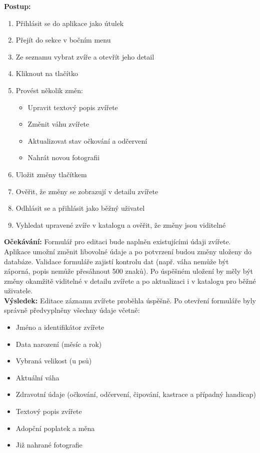 \documentclass[czech, bp, kiv, he, iso690numb, pdf]{fasthesis}
\begin{document}
    \noindent \textbf{Postup:}
    \begin{enumerate}
        \item Přihlásit se do aplikace jako útulek
        \item Přejít do sekce  v bočním menu
        \item Ze seznamu vybrat zvíře a otevřít jeho detail
        \item Kliknout na tlačítko 
        \item Provést několik změn:
        \begin{itemize}
            \item Upravit textový popis zvířete
            \item Změnit váhu zvířete
            \item Aktualizovat stav očkování a odčervení
            \item Nahrát novou fotografii
        \end{itemize}
        \item Uložit změny tlačítkem 
        \item Ověřit, že změny se zobrazují v detailu zvířete
        \item Odhlásit se a přihlásit jako běžný uživatel
        \item Vyhledat upravené zvíře v katalogu a ověřit, že změny jsou viditelné
    \end{enumerate}

    \noindent \textbf{Očekávání:}
    Formulář pro editaci bude naplněn existujícími údaji zvířete. Aplikace umožní změnit libovolné údaje a po potvrzení budou změny uloženy do databáze. Validace formuláře zajistí kontrolu dat (např. váha nemůže být záporná, popis nemůže přesáhnout 500 znaků). Po úspěšném uložení by měly být změny okamžitě viditelné v detailu zvířete a po aktualizaci i v katalogu pro běžné uživatele.\\

    \noindent \textbf{Výsledek:}
    Editace záznamu zvířete proběhla úspěšně. Po otevření formuláře byly správně předvyplněny všechny údaje včetně:
    \begin{itemize}
        \item Jméno a identifikátor zvířete
        \item Data narození (měsíc a rok)
        \item Vybraná velikost (u psů)
        \item Aktuální váha
        \item Zdravotní údaje (očkování, odčervení, čipování, kastrace a případný handicap)
        \item Textový popis zvířete
        \item Adopční poplatek a měna
        \item Již nahrané fotografie
    \end{itemize}
\end{document}
